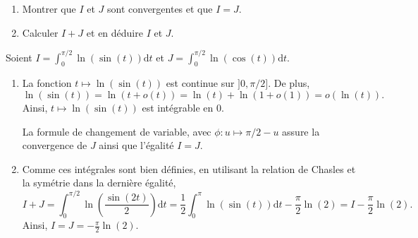 
\begin{exercice}
\cite{Oraux - CCP-PSI-2016}
\begin{enumerate}
\item Montrer que $I$ et $J$ sont convergentes et que $I = J$.
\item Calculer $I + J$ et en déduire $I$ et $J$.
\end{enumerate}
\end{exercice}


\begin{elem_sol}
Soient $I = \int_0^{\pi/2} \ln(\sin(t)) \mathrm{d} t$ et $J = \int_0^{\pi/2} \ln(\cos(t)) \mathrm{d} t$.

\begin{enumerate}
\item La fonction $t \mapsto \ln(\sin(t))$ est continue sur $]0,\pi/2]$. De plus,
\[
\ln(\sin(t)) = \ln(t + o(t)) = \ln(t) + \ln(1 + o(1)) = o(\ln(t)).
\]
Ainsi, $t \mapsto \ln(\sin(t))$ est intégrable en $0$.

La formule de changement de variable, avec $\phi : u \mapsto \pi/2 - u$ assure la convergence de $J$ ainsi que l'égalité $I = J$.

\item Comme ces intégrales sont bien définies, en utilisant la relation de Chasles et la symétrie dans la dernière égalité,
\[
I + J = \int_0^{\pi/2} \ln\left(\frac{\sin(2t)}{2}\right) \mathrm{d} t = \frac{1}{2} \int_0^\pi \ln(\sin(t)) \mathrm{d} t - \frac{\pi}{2} \ln(2) = I - \frac{\pi}{2} \ln(2).
\]
Ainsi, $I = J = -\frac{\pi}{2} \ln(2)$.
\end{enumerate}
\end{elem_sol}

    
